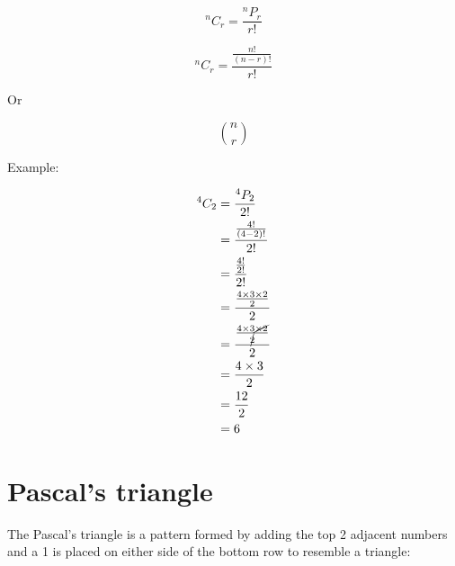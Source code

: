 \documentclass{book}
\begin{document}
\[^nC_r = \frac{^nP_r}{r!}\]

\[^nC_r = \frac{\frac{n!}{(n-r)!}}{r!}\]

Or

\[
	\binom{n}{r}
\]

Example:

\begin{align*}
	^4C_2 & = \frac{^4P_2}{2!}                                          \\
	      & = \frac{\frac{4!}{(4 - 2)!}}{2!}                            \\
	      & = \frac{\frac{4!}{2!}}{2!}                                  \\
	      & = \frac{\frac{4 \times 3 \times 2}{2}}{2}                   \\
	      & = \frac{\frac{4 \times 3 \cancel{\times 2}}{\cancel{2}}}{2} \\
	      & = \frac{4 \times 3}{2}                                      \\
	      & = \frac{12}{2}                                              \\
	      & = 6                                                         \\
\end{align*}



\section{Pascal's triangle}
The Pascal's triangle is a pattern formed by adding the top 2 adjacent numbers and a 1 is placed on either side of the bottom row to resemble a triangle:
\end{document}
